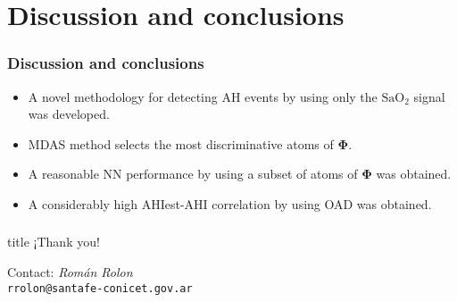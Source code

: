 \documentclass{beamer}
\renewcommand{\vec}[1]{\boldsymbol{\mathbf{#1}}}
\begin{document}
\section{Discussion and conclusions}
\begin{frame}
\frametitle {Discussion and conclusions}
     \vspace{-5mm}
  \begin{itemize}
   \item A novel methodology for detecting AH events by using only the $\text{SaO}_2$ signal was developed.
   \pause
   \item MDAS method selects the most discriminative atoms of $\vec{\Phi}$.   
   \pause
   \item A reasonable NN performance by using a subset of atoms of $\vec{\Phi}$ was obtained.
   \pause
   \item A considerably high AHIest-AHI correlation by using OAD was obtained.
   \pause
   \end{itemize}
\end{frame}
\begin{frame}
 \frametitle{}
 \begin{center}
    \vspace{-5mm}
  \begin{beamercolorbox}[center,shadow=true,rounded=true]{title}
    ¡Thank you!\\
  \end{beamercolorbox}
  \vspace{20mm}
  \footnotesize Contact: \emph{Román Rolon}\\
\scriptsize \texttt{rrolon@santafe-conicet.gov.ar}\\
  \vspace{2cm}
 \end{center}
\end{frame}
\end{document}
